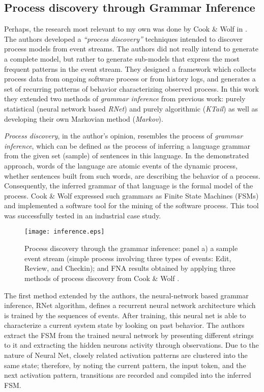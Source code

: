 \subsection{Process discovery through Grammar Inference} \label{grammar}
Perhaps, the research most relevant to my own was done by Cook \& Wolf in \cite{citeulike:328044}. The authors developed a \textit{``process discovery''} techniques intended to discover process models from event streams. The authors did not really intend to generate a complete model, but rather to generate sub-models that express the most frequent patterns in the event stream. They designed a framework which collects process data from ongoing software process or from history logs, and generates a set of recurring patterns of behavior characterizing observed process. In this work they extended two methods of \textit{grammar inference} from previous work: purely statistical (neural network based \textit{RNet}) and purely algorithmic (\textit{KTail}) as well as developing their own Markovian method (\textit{Markov}). 

\textit{Process discovery}, in the author's opinion, resembles the process of \textit{grammar inference}, which can be defined as the process of inferring a language grammar from the given set (sample) of sentences in this language. In the demonstrated approach, words of the language are atomic events of the dynamic process, whether sentences built from such words, are describing the behavior of a process. Consequently, the inferred grammar of that language is the formal model of the process. Cook \& Wolf expressed such grammars as Finite State Machines (FSMs) and implemented a software tool for the mining of the software process. This tool was successfully tested in an industrial case study.

\begin{figure}[tbp]
   \centering
   \texttt{[image: inference.eps]}
   \caption{Process discovery through the grammar inference: panel a) a sample event stream (simple process involving three types of events: Edit, Review, and Checkin); and FNA results obtained by applying three methods of process discovery from Cook \& Wolf \cite{citeulike:328044}.}
   \label{fig:inference}
\end{figure}

The first method extended by the authors, the neural-network based grammar inference, RNet algorithm, defines a recurrent neural network architecture which is trained by the sequences of events. After training, this neural net is able to characterize a current system state by looking on past behavior. The authors extract the FSM from the trained neural network by presenting different strings to it and extracting the hidden neurons activity through observations. Due to the nature of Neural Net, closely related activation patterns are clustered into the same state; therefore, by noting the current pattern, the input token, and the next activation pattern, transitions are recorded and compiled into the inferred FSM.


